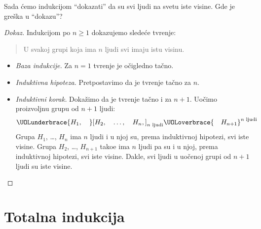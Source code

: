 \begin{EX}
  Sada \'cemo indukcijom ``dokazati'' da su svi ljudi na svetu iste visine. Gde je gre\v ska u ``dokazu''?
\end{EX}
\begin{proof}[Dokaz]
  Indukcijom po $n \ge 1$ dokazujemo slede\'ce tvr\dj enje:
  \begin{quote}
    U svakoj grupi koja ima $n$ ljudi svi imaju istu visinu.
  \end{quote}
  \begin{itemize}
  \item
    \emph{Baza indukcije.} Za $n = 1$ tvr\dj enje je o\v cigledno ta\v cno.
  
  \item
    \emph{Induktivna hipoteza.} Pretpostavimo da je tvr\dj enje ta\v cno za $n$.
  \item
    \emph{Induktivni korak.} Doka\v zimo da je tvr\dj enje ta\v cno i za $n + 1$.
    Uo\v cimo proizvoljnu grupu od $n + 1$ ljudi:
    $$
      \UOLunderbrace{H_1, \quad }[H_2, \quad \ldots, \quad H_n,]_{\text{$n$ ljudi}}\UOLoverbrace{ \quad H_{n+1}}^{\text{$n$ ljudi}}
    $$
    Grupa $H_1$, \ldots, $H_n$ ima $n$ ljudi i u njoj su, prema induktivnoj hipotezi, svi iste visine.
    Grupa $H_2$, \ldots, $H_{n+1}$ tako\dj e ima $n$ ljudi pa su i u njoj, prema induktivnoj hipotezi, svi iste visine.
    Dakle, svi ljudi u uo\v cenoj grupi od $n + 1$ ljudi su iste visine.\qedhere
  \end{itemize}
\end{proof}


\section{Totalna indukcija}

